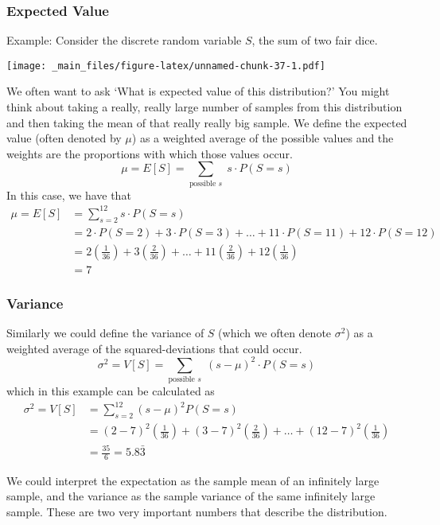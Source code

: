 \documentclass[]{book}
\begin{document}
\subsubsection{Expected Value}\label{expected-value}

Example: Consider the discrete random variable \(S\), the sum of two
fair dice.

\texttt{[image: \_main\_files/figure-latex/unnamed-chunk-37-1.pdf]}

We often want to ask `What is expected value of this distribution?' You
might think about taking a really, really large number of samples from
this distribution and then taking the mean of that really really big
sample. We define the expected value (often denoted by \(\mu\)) as a
weighted average of the possible values and the weights are the
proportions with which those values occur.
\[\mu=E[S]  =   \sum_{\textrm{possible }s}\;s\cdot P\left(S=s\right)\]
In this case, we have that \[\begin{aligned} \mu = E[S] 
&=  \sum_{s=2}^{12}s\cdot P(S=s) \\
&=  2\cdot P\left(S=2\right)+3\cdot P\left(S=3\right)+\dots+11\cdot P\left(S=11\right)+12\cdot P\left(S=12\right) \\
&=  2\left(\frac{1}{36}\right)+3\left(\frac{2}{36}\right)+\dots+11\left(\frac{2}{36}\right)+12\left(\frac{1}{36}\right) \\
&=  7
\end{aligned}\]

\subsubsection{Variance}\label{variance-1}

Similarly we could define the variance of \(S\) (which we often denote
\(\sigma^{2}\)) as a weighted average of the squared-deviations that
could occur.
\[ \sigma^{2}=V[S]  = \sum_{\textrm{possible }s}\; (s-\mu)^2 \cdot P\left(S=s\right)\]
which in this example can be calculated as
\[\begin{aligned} \sigma^{2}=V[S] 
  &= \sum_{s=2}^{12}\left(s-\mu\right)^{2}P(S=s) \\
    &= (2-7)^{2}\left(\frac{1}{36}\right)+(3-7)^{2}\left(\frac{2}{36}\right)+\dots+(12-7)^{2}\left(\frac{1}{36}\right) \\
    &= \frac{35}{6}=5.8\bar{3}
    \end{aligned}\]

We could interpret the expectation as the sample mean of an infinitely
large sample, and the variance as the sample variance of the same
infinitely large sample. These are two very important numbers that
describe the distribution.
\end{document}
